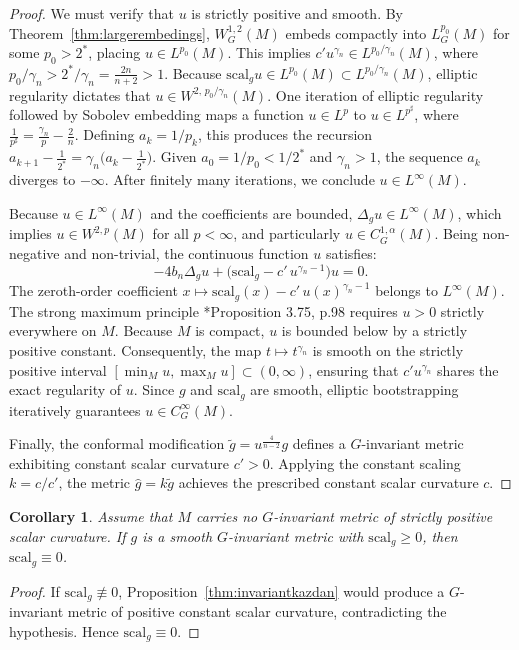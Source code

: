 \documentclass[12pt,a4paper]{amsart}
\theoremstyle{plain}
\newtheorem{corollary}[theorem]{Corollary}
\theoremstyle{definition}
\theoremstyle{remark}
\newcommand{\ga}{\mathit{g}} %
\begin{document}
\begin{proof}
We must verify that $u$ is strictly positive and smooth. By Theorem~\ref{thm:largerembedings}, $W^{1,2}_G(M)$ embeds compactly into $L^{p_0}_G(M)$ for some $p_0 > 2^*$, placing $u \in L^{p_0}(M)$. This implies $c'u^{\gamma_n} \in L^{p_0/\gamma_n}(M)$, where $p_0/\gamma_n > 2^*/\gamma_n = \frac{2n}{n+2} > 1$. Because $\mathrm{scal}_{\ga}u \in L^{p_0}(M) \subset L^{p_0/\gamma_n}(M)$, elliptic regularity dictates that $u \in W^{2,\,p_0/\gamma_n}(M)$. One iteration of elliptic regularity followed by Sobolev embedding maps a function $u \in L^{p}$ to $u \in L^{p^{\sharp}}$, where $\frac{1}{p^{\sharp}} = \frac{\gamma_n}{p} - \frac{2}{n}$. Defining $a_k = 1/p_k$, this produces the recursion $a_{k+1} - \frac{1}{2^*} = \gamma_n\bigl(a_k - \frac{1}{2^*}\bigr)$. Given $a_0 = 1/p_0 < 1/2^*$ and $\gamma_n > 1$, the sequence $a_k$ diverges to $-\infty$. After finitely many iterations, we conclude $u \in L^\infty(M)$.

Because $u \in L^\infty(M)$ and the coefficients are bounded, $\Delta_{\ga}u \in L^\infty(M)$, which implies $u \in W^{2,p}(M)$ for all $p < \infty$, and particularly $u \in C^{1,\alpha}_G(M)$. Being non-negative and non-trivial, the continuous function $u$ satisfies:
$$-4b_n\Delta_{\ga}u + \bigl(\mathrm{scal}_{\ga} - c'\,u^{\gamma_n-1}\bigr)u = 0.$$
The zeroth-order coefficient $x \mapsto \mathrm{scal}_{\ga}(x) - c'\,u(x)^{\gamma_n-1}$ belongs to $L^\infty(M)$. The strong maximum principle \cite{aubinbook}*{Proposition 3.75, p.98} requires $u > 0$ strictly everywhere on $M$. Because $M$ is compact, $u$ is bounded below by a strictly positive constant. Consequently, the map $t \mapsto t^{\gamma_n}$ is smooth on the strictly positive interval $[\min_M u, \max_M u] \subset (0,\infty)$, ensuring that $c'u^{\gamma_n}$ shares the exact regularity of $u$. Since $\ga$ and $\mathrm{scal}_{\ga}$ are smooth, elliptic bootstrapping iteratively guarantees $u \in C^\infty_G(M)$.

Finally, the conformal modification $\widetilde{\ga} = u^{\frac{4}{n-2}}\ga$ defines a $G$-invariant metric exhibiting constant scalar curvature $c' > 0$. Applying the constant scaling $k = c/c'$, the metric $\widehat{\ga} = k\widetilde{\ga}$ achieves the prescribed constant scalar curvature $c$.
\end{proof}

\begin{corollary}\label{cor:invariantkazdhan}
 Assume that $M$ carries no $G$-invariant metric of strictly positive scalar curvature. If $\ga$ is a smooth $G$-invariant metric with $\mathrm{scal}_{\ga}\geq 0$, then $\mathrm{scal}_{\ga} \equiv 0$.
\end{corollary}
\begin{proof}
If $\mathrm{scal}_{\ga}\not\equiv 0$, Proposition~\ref{thm:invariantkazdan} would produce a $G$-invariant metric of positive constant scalar curvature, contradicting the hypothesis. Hence $\mathrm{scal}_{\ga}\equiv 0$.
\end{proof}
\end{document}
